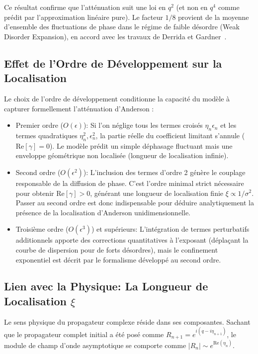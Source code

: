 Ce résultat confirme que l'atténuation suit une loi en $q^2$ (et non en $q^4$ comme prédit par l'approximation linéaire pure). Le facteur $1/8$ provient de la moyenne d'ensemble des fluctuations de phase dans le régime de faible désordre (Weak Disorder Expansion), en accord avec les travaux de Derrida et Gardner~\cite{derrida1984lyapounov}.

\subsection{Effet de l'Ordre de Développement sur la Localisation}
Le choix de l'ordre de développement conditionne la capacité du modèle à capturer formellement l'atténuation d'Anderson :
\begin{itemize}
    \item Premier ordre ($O(\epsilon)$): Si l'on néglige tous les termes croisés $\eta_n \epsilon_n$ et les termes quadratiques $\eta_n^2, \epsilon_n^2$, la partie réelle du coefficient limitant s'annule ($\text{Re}[\gamma] = 0$). Le modèle prédit un simple déphasage fluctuant mais une enveloppe géométrique non localisée (longueur de localisation infinie).
    \item Second ordre ($O(\epsilon^2)$): L'inclusion des termes d'ordre 2 génère le couplage responsable de la diffusion de phase. C'est l'ordre minimal strict nécessaire pour obtenir $\text{Re}[\gamma] > 0$, générant une longueur de localisation finie $\xi \propto 1/\sigma^2$. Passer au second ordre est donc indispensable pour déduire analytiquement la présence de la localisation d'Anderson unidimensionnelle.
    \item Troisième ordre ($O(\epsilon^3)$) et supérieurs: L'intégration de termes perturbatifs additionnels apporte des corrections quantitatives à l'exposant (déplaçant la courbe de dispersion pour de forts désordres), mais le confinement exponentiel est décrit par le formalisme développé au second ordre.
\end{itemize}

\subsection[Lien avec la Physique: La Longueur de Localisation xi]{Lien avec la Physique: La Longueur de Localisation $\xi$}
Le sens physique du propagateur complexe réside dans ses composantes. Sachant que le propagateur complet initial a été posé comme $R_{n+1} = e^{i(q - i\eta_{n+1})}$, le module de champ d'onde asymptotique se comporte comme $|R_n| \sim e^{\text{Re}(\eta_n)}$.

